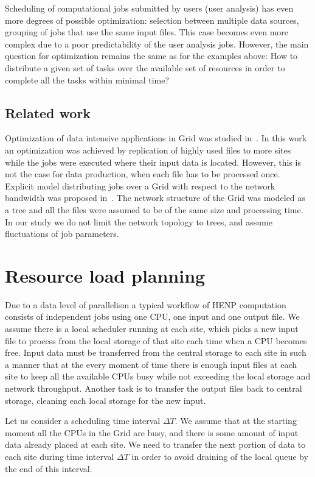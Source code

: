 \documentclass[english]{ddny}
\begin{document}
Scheduling of computational jobs submitted by users (user analysis) has even more degrees of possible optimization: selection between multiple data sources, grouping of jobs that use the same input files. This case becomes even more complex due to a poor predictability of the user analysis jobs. However,  the main question for optimization remains the same as for the examples above: How to distribute a given set of tasks over the available set of resources in order to complete all the tasks within minimal time?

\subsection{Related work}
Optimization of data intensive applications in Grid was studied
in~\cite{Globus_scheduler}. In this work an optimization was achieved by
replication of highly used files to more sites while the jobs were executed
where their input data is located. However, this is not the case for data
production, when each file has to be processed once. 
%
Explicit model distributing jobs over a Grid with respect to the network
bandwidth was proposed in~\cite{Trees}. The network structure of the Grid was
modeled as a tree and all the files were assumed to be of the same size and
processing time. In our study we do not limit the network topology to trees,
and assume fluctuations of job parameters. 



\section{Resource load planning}
\label{Network_flow}
Due to a data level of parallelism a typical workflow of HENP computation
consists of independent jobs using one CPU, one input and one output file. We
assume there is a local scheduler running at each site, which picks a new
input file to process from the local storage of that site each time when a CPU becomes
free. Input data must be transferred from the central storage
to each site in such a manner that at the every moment of time there is enough
input files at each site to keep all the available CPUs busy while not
exceeding the local storage and network throughput. Another task
is to transfer the output files back to central storage, cleaning each local
storage for the new input.

Let us consider a scheduling time interval $\Delta T$. We assume that at the
starting moment all the CPUs in the Grid are busy, and there is some amount of
input data already placed at each site. We need to transfer the next portion
of data to each site during time interval $\Delta T$ in order to avoid
draining of the local queue by the end of this interval. 
\end{document}
